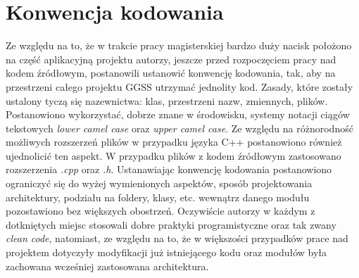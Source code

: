 \section{Konwencja kodowania}
Ze względu na to, że w trakcie pracy magisterskiej bardzo duży nacisk położono na część aplikacyjną projektu autorzy, jeszcze przed rozpoczęciem pracy nad kodem źródłowym, postanowili ustanowić konwencję kodowania, tak, aby na przestrzeni całego projektu GGSS utrzymać jednolity kod. Zasady, które zostały ustalony tyczą się nazewnictwa: klas, przestrzeni nazw, zmiennych, plików. Postanowiono wykorzystać, dobrze znane w środowisku, systemy notacji ciągów tekstowych \emph{lower camel case} oraz \emph{upper camel case}. Ze względu na różnorodność możliwych rozszerzeń plików w przypadku języka C++ postanowiono również ujednolicić ten aspekt. W przypadku plików z kodem źródłowym zastosowano rozszerzenia \emph{.cpp} oraz \emph{.h}. Ustanawiając konwencję kodowania postanowiono ograniczyć się do wyżej wymienionych aspektów, sposób projektowania architektury, podziału na foldery, klasy, etc. wewnątrz danego modułu pozostawiono bez większych obostrzeń. Oczywiście autorzy w każdym z dotkniętych miejsc stosowali dobre praktyki programistyczne oraz tak zwany \emph{clean code}, natomiast, ze względu na to, że w większości przypadków prace nad projektem dotyczyły modyfikacji już istniejącego kodu oraz modułów była zachowana wcześniej zastosowana architektura.

